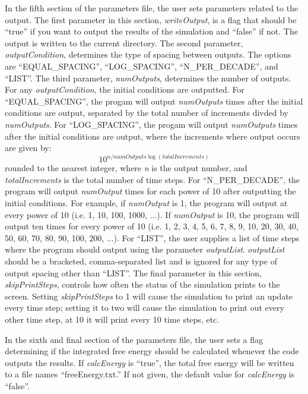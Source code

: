 \documentclass[10pt]{article} %
\begin{document}
In the fifth section of the parameters file, the user sets parameters related to the output. The first parameter in this section, \emph{writeOutput}, is a flag that should be ``true'' if you want to output the results of the simulation and ``false'' if not. The output is written to the current directory. The second parameter, \emph{outputCondition}, determines the type of spacing between outputs. The options are ``EQUAL\_SPACING'', ``LOG\_SPACING'',  ``N\_PER\_DECADE'', and ``LIST''. The third parameter, \emph{numOutputs}, determines the number of outputs. For any \emph{outputCondition}, the initial conditions are outputted. For ``EQUAL\_SPACING'', the progam will output \emph{numOutputs} times after the initial conditions are output, separated by the total number of increments divded by \emph{numOutputs}. For ``LOG\_SPACING'', the progam will output \emph{numOutputs} times after the initial conditions are output, where the increments where output occurs are given by:
\begin{equation}
10^{n/numOutputs \log(totalIncrements)}
\end{equation}
rounded to the nearest integer, where \emph{n} is the output number, and \emph{totalIncrements} is the total number of time steps. For ``N\_PER\_DECADE'', the program will output \emph{numOutput} times for each power of 10 after outputting the initial conditions. For example, if \emph{numOutput} is 1, the program will output at every power of 10 (i.e. 1, 10, 100, 1000, ...). If \emph{numOutput} is 10, the program will output ten times for every power of 10 (i.e. 1, 2, 3, 4, 5, 6, 7, 8, 9, 10, 20, 30, 40, 50, 60, 70, 80, 90, 100, 200, ...). For ``LIST'', the user supplies a list of time steps where the program should output using the parameter \emph{outputList}. \emph{outputList} should be a bracketed, comma-separated list and is ignored for any type of output spacing other than ``LIST''. The final parameter in this section, \emph{skipPrintSteps}, controls how often the status of the simulation prints to the screen. Setting \emph{skipPrintSteps} to 1 will cause the simulation to print an update every time step; setting it to two will cause the simulation to print out every other time step, at 10 it will print every 10 time steps, etc.

In the sixth and final section of the parameters file, the user sets a flag determining if the integrated free energy should be calculated whenever the code outputs the results. If \emph{calcEnergy} is ``true'', the total free energy will be written to a file names ``freeEnergy.txt.'' If not given, the default value for \emph{calcEnergy} is ``false''.
\end{document}
